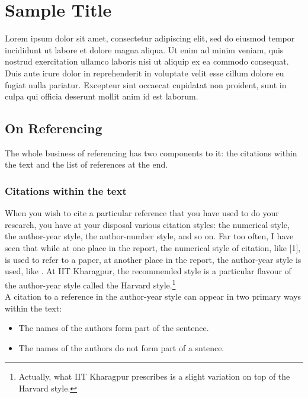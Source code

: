\chapter{Sample Title}

Lorem ipsum dolor sit amet, consectetur adipiscing elit, sed do eiusmod tempor incididunt ut labore et dolore magna aliqua. Ut enim ad minim veniam, quis nostrud exercitation ullamco laboris nisi ut aliquip ex ea commodo consequat. Duis aute irure dolor in reprehenderit in voluptate velit esse cillum dolore eu fugiat nulla pariatur. Excepteur sint occaecat cupidatat non proident, sunt in culpa qui officia deserunt mollit anim id est laborum.

\section{On Referencing}


The whole business of referencing has two components to it: the citations within the text and the list of references at the end.

\subsection{Citations within the text}
When you wish to cite a particular reference that you have used to do your research, you have at your disposal various citation styles: the numerical style, the author-year style, the author-number style, and so on. Far too often, I have seen that while at one place in the report, the numerical style of citation, like [1], is used to refer to a paper, at another place in the report, the author-year style is used, like \citep{2013JMPSCui}. At IIT Kharagpur, the recommended style is a particular flavour of the author-year style called the Harvard style.\footnote{Actually, what IIT Kharagpur prescribes is a slight variation on top of the Harvard style.}  \\

A citation to a reference in the author-year style can appear in two primary ways within the text:
\begin{itemize}
\item The names of the authors form part of the sentence. 
\item The names of the authors do not form part of a sntence.
\end{itemize}


